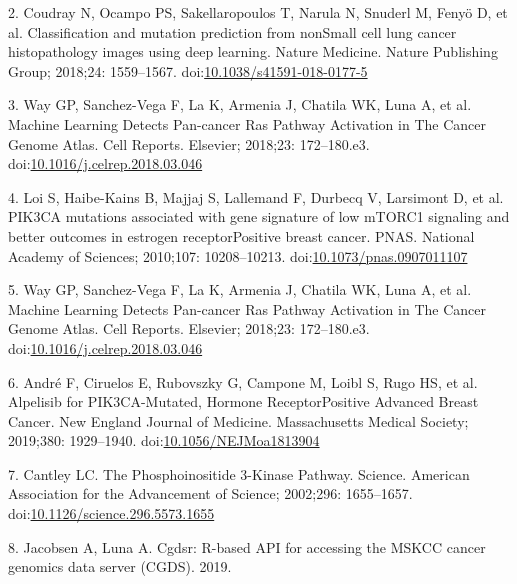 \documentclass[10pt,letterpaper]{article}
\begin{document}
\leavevmode\hypertarget{ref-coudrayClassificationMutationPrediction2018}{}%
2. Coudray N, Ocampo PS, Sakellaropoulos T, Narula N, Snuderl M, Fenyö
D, et al. Classification and mutation prediction from nonSmall cell lung
cancer histopathology images using deep learning. Nature Medicine.
Nature Publishing Group; 2018;24: 1559--1567.
doi:\href{https://doi.org/10.1038/s41591-018-0177-5}{10.1038/s41591-018-0177-5}

\leavevmode\hypertarget{ref-wayMachineLearningDetects2018}{}%
3. Way GP, Sanchez-Vega F, La K, Armenia J, Chatila WK, Luna A, et al.
Machine Learning Detects Pan-cancer Ras Pathway Activation in The Cancer
Genome Atlas. Cell Reports. Elsevier; 2018;23: 172--180.e3.
doi:\href{https://doi.org/10.1016/j.celrep.2018.03.046}{10.1016/j.celrep.2018.03.046}

\leavevmode\hypertarget{ref-loiPIK3CAMutationsAssociated2010}{}%
4. Loi S, Haibe-Kains B, Majjaj S, Lallemand F, Durbecq V, Larsimont D,
et al. PIK3CA mutations associated with gene signature of low mTORC1
signaling and better outcomes in estrogen receptorPositive breast
cancer. PNAS. National Academy of Sciences; 2010;107: 10208--10213.
doi:\href{https://doi.org/10.1073/pnas.0907011107}{10.1073/pnas.0907011107}

\leavevmode\hypertarget{ref-way_2018_machine_cellreports}{}%
5. Way GP, Sanchez-Vega F, La K, Armenia J, Chatila WK, Luna A, et al.
Machine Learning Detects Pan-cancer Ras Pathway Activation in The Cancer
Genome Atlas. Cell Reports. Elsevier; 2018;23: 172--180.e3.
doi:\href{https://doi.org/10.1016/j.celrep.2018.03.046}{10.1016/j.celrep.2018.03.046}

\leavevmode\hypertarget{ref-andre_2019_alpelisib_nengljmeda}{}%
6. André F, Ciruelos E, Rubovszky G, Campone M, Loibl S, Rugo HS, et al.
Alpelisib for PIK3CA-Mutated, Hormone ReceptorPositive Advanced Breast
Cancer. New England Journal of Medicine. Massachusetts Medical Society;
2019;380: 1929--1940.
doi:\href{https://doi.org/10.1056/NEJMoa1813904}{10.1056/NEJMoa1813904}

\leavevmode\hypertarget{ref-cantleyPhosphoinositide3KinasePathway2002}{}%
7. Cantley LC. The Phosphoinositide 3-Kinase Pathway. Science. American
Association for the Advancement of Science; 2002;296: 1655--1657.
doi:\href{https://doi.org/10.1126/science.296.5573.1655}{10.1126/science.296.5573.1655}

\leavevmode\hypertarget{ref-jacobsenCgdsrRbasedAPI2019}{}%
8. Jacobsen A, Luna A. Cgdsr: R-based API for accessing the MSKCC cancer
genomics data server (CGDS). 2019.
\end{document}
